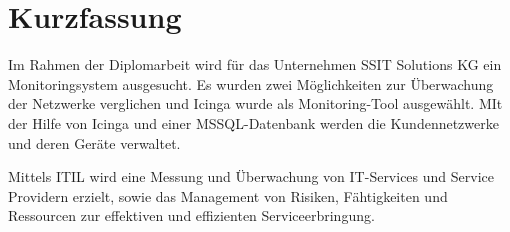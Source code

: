 \chapter{Kurzfassung}

Im Rahmen der Diplomarbeit wird für das Unternehmen 
SSIT Solutions KG ein Monitoringsystem ausgesucht.
Es wurden zwei Möglichkeiten zur Überwachung der Netzwerke 
verglichen und Icinga wurde als Monitoring-Tool ausgewählt.
MIt der Hilfe von Icinga und einer MSSQL-Datenbank werden die Kundennetzwerke 
und deren Geräte verwaltet.

Mittels ITIL wird eine Messung und Überwachung
von IT-Services und Service Providern erzielt, 
sowie das Management von Risiken, Fähtigkeiten und Ressourcen zur 
effektiven und effizienten Serviceerbringung.